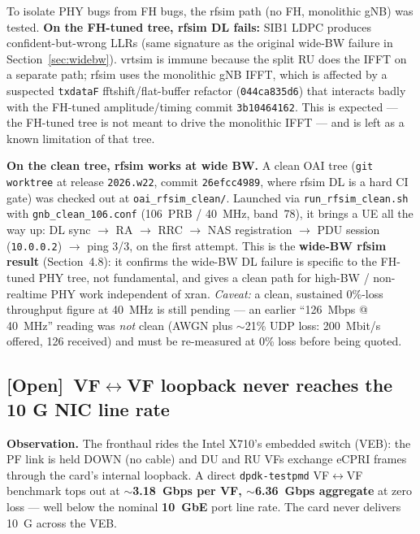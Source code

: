 \documentclass[11pt,a4paper]{article}
\newcommand{\openissue}{\textcolor{opencol}{\textbf{[Open]}}}
\begin{document}
To isolate PHY bugs from FH bugs, the rfsim path (no FH, monolithic gNB) was tested.
\textbf{On the FH-tuned tree, rfsim DL fails:} SIB1 LDPC produces confident-but-wrong LLRs
(same signature as the original wide-BW failure in Section~\ref{sec:widebw}). vrtsim is immune
because the split RU does the IFFT on a separate path; rfsim uses the monolithic gNB IFFT,
which is affected by a suspected \texttt{txdataF} fftshift/flat-buffer refactor
(\texttt{044ca835d6}) that interacts badly with the FH-tuned amplitude/timing commit
\texttt{3b10464162}. This is expected --- the FH-tuned tree is not meant to drive the
monolithic IFFT --- and is left as a known limitation of that tree.

\textbf{On the clean tree, rfsim works at wide BW.} A clean OAI tree (\texttt{git worktree} at
release \texttt{2026.w22}, commit \texttt{26efcc4989}, where rfsim DL is a hard CI gate) was
checked out at \texttt{oai\_rfsim\_clean/}. Launched via \texttt{run\_rfsim\_clean.sh} with
\texttt{gnb\_clean\_106.conf} (106~PRB / 40~MHz, band~78), it brings a UE all the way up:
DL sync $\rightarrow$ RA $\rightarrow$ RRC $\rightarrow$ NAS registration $\rightarrow$ PDU
session (\texttt{10.0.0.2}) $\rightarrow$ ping 3/3, on the first attempt. This is the
\textbf{wide-BW rfsim result} (Section~4.8): it confirms the wide-BW DL failure is specific to
the FH-tuned PHY tree, not fundamental, and gives a clean path for high-BW / non-realtime PHY
work independent of xran. \emph{Caveat:} a clean, sustained 0\%-loss throughput figure at
40~MHz is still pending --- an earlier ``126~Mbps @ 40~MHz'' reading was \emph{not} clean (AWGN
plus $\sim$21\% UDP loss: 200~Mbit/s offered, 126 received) and must be re-measured at 0\% loss
before being quoted.

\subsection{\texorpdfstring{\openissue}{[Open]}\ VF$\leftrightarrow$VF loopback never reaches the 10 G NIC line rate}
\label{sec:vf}

\textbf{Observation.} The fronthaul rides the Intel X710's embedded switch (VEB): the PF link
is held DOWN (no cable) and DU and RU VFs exchange eCPRI frames through the card's internal
loopback. A direct \texttt{dpdk-testpmd} VF$\leftrightarrow$VF benchmark tops out at
\textbf{$\sim$3.18~Gbps per VF, $\sim$6.36~Gbps aggregate} at zero loss --- well below the
nominal \textbf{10~GbE} port line rate. The card never delivers 10~G across the VEB.
\end{document}
